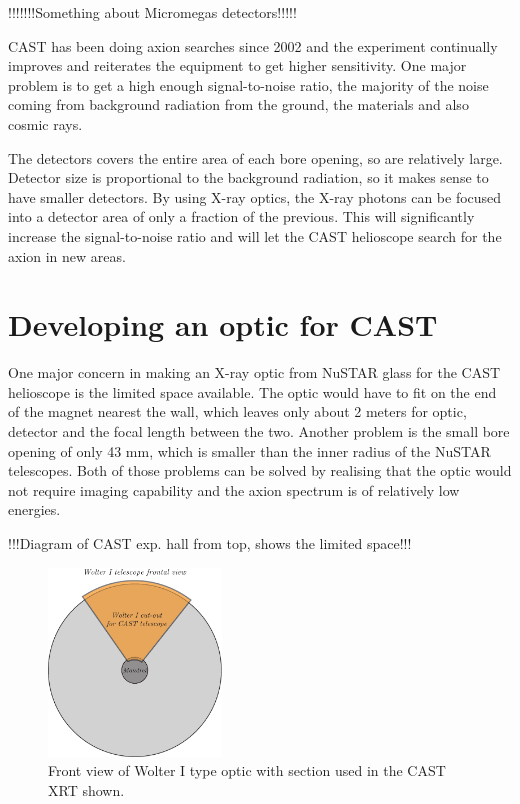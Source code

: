 !!!!!!!Something about Micromegas detectors!!!!!

CAST has been doing axion searches since 2002 and the experiment continually improves and reiterates the equipment to get higher sensitivity. One major problem is to get a high enough signal-to-noise ratio, the majority of the noise coming from background radiation from the ground, the materials and also cosmic rays.

The detectors covers the entire area of each bore opening, so are relatively large. Detector size is proportional to the background radiation, so it makes sense to have smaller detectors. By using X-ray optics, the X-ray photons can be focused into a detector area of only a fraction of the previous. This will significantly increase the signal-to-noise ratio and will let the CAST helioscope search for the axion in new areas.

\section{Developing an optic for CAST}
One major concern in making an X-ray optic from NuSTAR glass for the CAST helioscope is the limited space available. The optic would have to fit on the end of the magnet nearest the wall, which leaves only about 2 meters for optic, detector and the focal length between the two. Another problem is the small bore opening of only 43 mm, which is smaller than the inner radius of the NuSTAR telescopes. Both of those problems can be solved by realising that the optic would not require imaging capability and the axion spectrum is of relatively low energies.

!!!Diagram of CAST exp. hall from top, shows the limited space!!!

\begin{figure}[htbp]
  \centering
    \includegraphics[height=5cm]{figures/cast/wolter1-cutout.pdf}
  \caption{\footnotesize Front view of Wolter I type optic with section used in the CAST XRT shown.}
  \label{fig:wolter1-cutout}
\end{figure}

